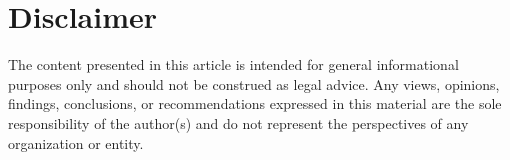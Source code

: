 \documentclass[sigconf, nonacm]{acmart}
\begin{document}








\section{Disclaimer}
The content presented in this article is intended for general informational purposes only and should not be construed as legal advice. Any views, opinions, findings, conclusions, or recommendations expressed in this material are the sole responsibility of the author(s) and do not represent the perspectives of any organization or entity.


\begin{comment}
  \begin{acks}
Ack.
\end{acks}
\end{comment}






\end{document}
